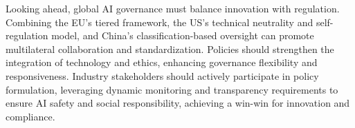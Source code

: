 Looking ahead, global AI governance must balance innovation with regulation. Combining the EU’s tiered framework, the US’s technical neutrality and self-regulation model, and China’s classification-based oversight can promote multilateral collaboration and standardization. Policies should strengthen the integration of technology and ethics, enhancing governance flexibility and responsiveness. Industry stakeholders should actively participate in policy formulation, leveraging dynamic monitoring and transparency requirements to ensure AI safety and social responsibility, achieving a win-win for innovation and compliance.




